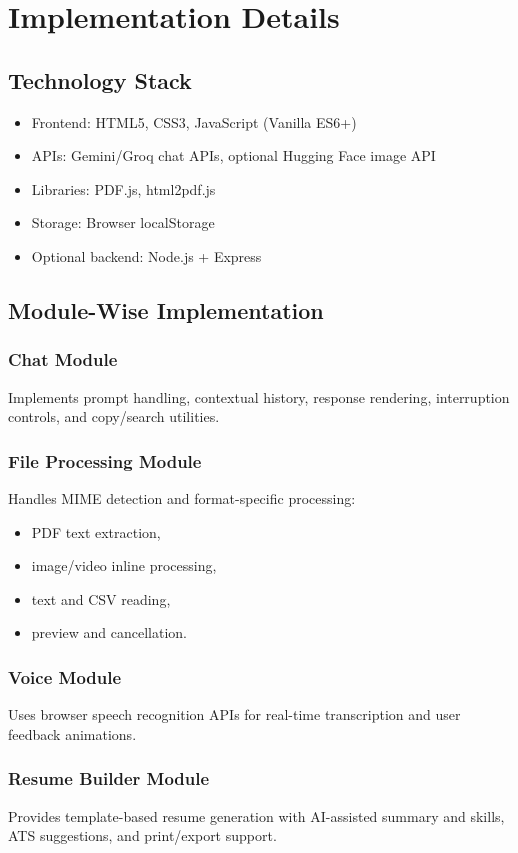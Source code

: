 \documentclass[12pt,a4paper]{report}
\begin{document}
\chapter{Implementation Details}
\section{Technology Stack}
\begin{itemize}
  \item Frontend: HTML5, CSS3, JavaScript (Vanilla ES6+)
  \item APIs: Gemini/Groq chat APIs, optional Hugging Face image API
  \item Libraries: PDF.js, html2pdf.js
  \item Storage: Browser localStorage
  \item Optional backend: Node.js + Express
\end{itemize}

\section{Module-Wise Implementation}
\subsection{Chat Module}
Implements prompt handling, contextual history, response rendering, interruption controls, and copy/search utilities.

\subsection{File Processing Module}
Handles MIME detection and format-specific processing:
\begin{itemize}
  \item PDF text extraction,
  \item image/video inline processing,
  \item text and CSV reading,
  \item preview and cancellation.
\end{itemize}

\subsection{Voice Module}
Uses browser speech recognition APIs for real-time transcription and user feedback animations.

\subsection{Resume Builder Module}
Provides template-based resume generation with AI-assisted summary and skills, ATS suggestions, and print/export support.
\end{document}
